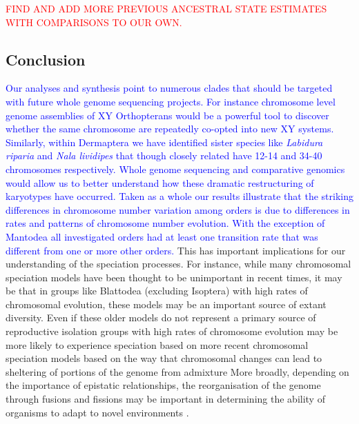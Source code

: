 \documentclass[]{rsos}%
\begin{document}
\textcolor{red}{FIND AND ADD MORE PREVIOUS ANCESTRAL STATE ESTIMATES WITH COMPARISONS TO OUR OWN.}



\subsection{Conclusion}

\textcolor{blue}{Our analyses and synthesis point to numerous clades that should be targeted with future whole genome sequencing projects. 
For instance chromosome level genome assemblies of XY Orthopterans would be a powerful tool to discover whether the same chromosome are repeatedly co-opted into new XY systems.
Similarly, within Dermaptera we have identified sister species like \textit{Labidura riparia} and \textit{Nala lividipes} that though closely related have 12-14 and 34-40 chromosomes respectively. 
Whole genome sequencing and comparative genomics would allow us to better understand how these dramatic restructuring of karyotypes have occurred.
Taken as a whole our results illustrate that the striking differences in chromosome number variation among orders is due to differences in rates and patterns of chromosome number evolution.
With the exception of Mantodea all investigated orders had at least one transition rate that was different from one or more other orders.} 
This has important implications for our understanding of the speciation processes.
For instance, while many chromosomal speciation models \cite{baker1986, white} have been thought to be unimportant in recent times, it may be that in groups like Blattodea (excluding Isoptera) with high rates of chromosomal evolution, these models may be an important source of extant diversity.
Even if these older models do not represent a primary source of reproductive isolation groups with high rates of chromosome evolution may be more likely to experience speciation based on more recent chromosomal speciation models based on the way that chromosomal changes can lead to sheltering of portions of the genome from admixture \cite{rieseberg2001} 
More broadly, depending on the importance of epistatic relationships, the reorganisation of the genome through fusions and fissions may be important in determining the ability of organisms to adapt to novel environments \cite{stebbins1971}.
\newpage
\end{document}
